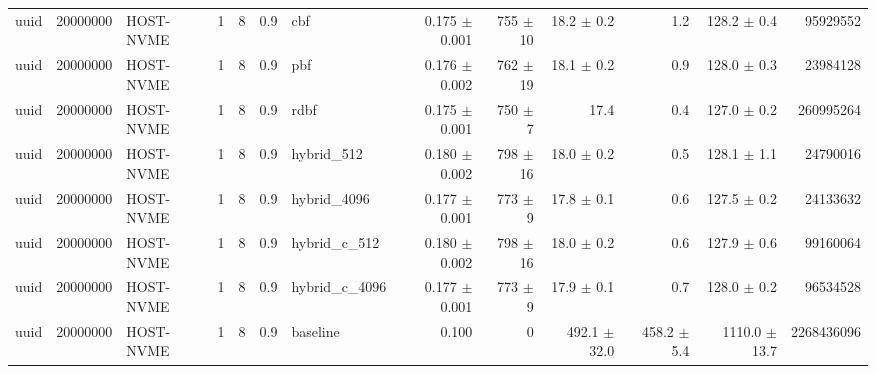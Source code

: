 \begin{tabular}{lllllllrrrrrr}
uuid & 20000000 & HOST-NVME & 1 & 8 & 0.9 & cbf & 0.175 $\pm$ 0.001 & 755 $\pm$ 10 & 18.2 $\pm$ 0.2 & 1.2 & 128.2 $\pm$ 0.4 & 95929552 \\
uuid & 20000000 & HOST-NVME & 1 & 8 & 0.9 & pbf & 0.176 $\pm$ 0.002 & 762 $\pm$ 19 & 18.1 $\pm$ 0.2 & 0.9 & 128.0 $\pm$ 0.3 & 23984128 \\
uuid & 20000000 & HOST-NVME & 1 & 8 & 0.9 & rdbf & 0.175 $\pm$ 0.001 & 750 $\pm$ 7 & 17.4 & 0.4 & 127.0 $\pm$ 0.2 & 260995264 \\
uuid & 20000000 & HOST-NVME & 1 & 8 & 0.9 & hybrid\_512 & 0.180 $\pm$ 0.002 & 798 $\pm$ 16 & 18.0 $\pm$ 0.2 & 0.5 & 128.1 $\pm$ 1.1 & 24790016 \\
uuid & 20000000 & HOST-NVME & 1 & 8 & 0.9 & hybrid\_4096 & 0.177 $\pm$ 0.001 & 773 $\pm$ 9 & 17.8 $\pm$ 0.1 & 0.6 & 127.5 $\pm$ 0.2 & 24133632 \\
uuid & 20000000 & HOST-NVME & 1 & 8 & 0.9 & hybrid\_c\_512 & 0.180 $\pm$ 0.002 & 798 $\pm$ 16 & 18.0 $\pm$ 0.2 & 0.6 & 127.9 $\pm$ 0.6 & 99160064 \\
uuid & 20000000 & HOST-NVME & 1 & 8 & 0.9 & hybrid\_c\_4096 & 0.177 $\pm$ 0.001 & 773 $\pm$ 9 & 17.9 $\pm$ 0.1 & 0.7 & 128.0 $\pm$ 0.2 & 96534528 \\
uuid & 20000000 & HOST-NVME & 1 & 8 & 0.9 & baseline & 0.100 & 0 & 492.1 $\pm$ 32.0 & 458.2 $\pm$ 5.4 & 1110.0 $\pm$ 13.7 & 2268436096 \\
\bottomrule
\end{tabular}
